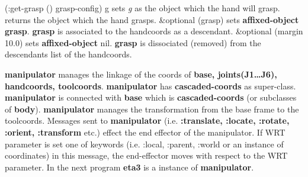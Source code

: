 \begin{refdesc}
{%
}
  {}{
(:get-grasp () grasp-config)
}
  {g}{
sets {\it g} as the object which the hand will grasp.
}
  {}{
returns the object which the hand grasps.
}
  {\&optional (grasp)}{
sets {\bf affixed-object} {\bf grasp}.
{\bf grasp} is associated to the handcoords as a descendant. 
}
  {\&optional (margin 10.0)}{
sets {\bf affixed-object} nil.
{\bf grasp} is dissociated (removed) from the descendants list of the handcoords.
}

\end{refdesc}
{\bf manipulator} manages the linkage of the coords of 
{\bf base, joints(J1\ldots J6), handcoords, toolcoords}. 
{\bf manipulator} has {\bf cascaded-coords} as super-class. 
{\bf manipulator} is connected with {\bf base} which is {\bf cascaded-coords}
(or subclasses of {\bf body}). {\bf manipulator} manages the transformation from 
the base frame to the toolcoords. Messages sent to {\bf manipulator} 
(i.e. {\bf :translate, :locate, :rotate, :orient, :transform} etc.) effect 
the end effector of the manipulator. If WRT parameter is set one of keywords 
(i.e. :local, :parent, :world or an instance of coordinates) in this message, 
the end-effector  moves with respect to the WRT parameter. 
In the next program {\bf eta3} is a instance of {\bf manipulator}.



